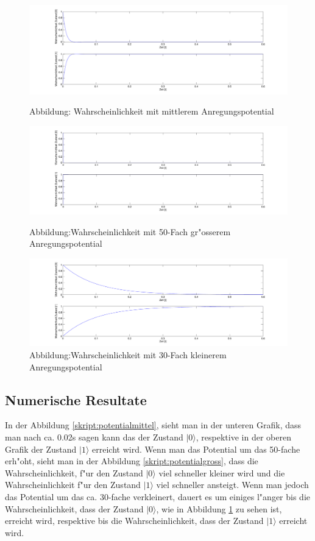 \begin{refsection}
\begin{figure}
\centering
\includegraphics[width=1\textwidth]{flash/graphics/potentialmittel.pdf}
\caption{Abbildung: Wahrscheinlichkeit mit mittlerem Anregungspotential
\label{skript:potentialmittel}}
%
\centering
\includegraphics[width=1\textwidth]{flash/graphics/potentialgross.pdf}
\caption{Abbildung:Wahrscheinlichkeit mit 50-Fach gr"osserem Anregungspotential
\label{skript:potentialgross}}
%
\centering
\includegraphics[width=1\textwidth]{flash/graphics/potentialklein.pdf}
\caption{Abbildung:Wahrscheinlichkeit mit 30-Fach kleinerem Anregungspotential
\label{skript:potentialklein}}
\end{figure}

\subsection{Numerische Resultate}
In der Abbildung \ref{skript:potentialmittel}, sieht man in der unteren
Grafik, dass man nach ca. 0.02s sagen kann das der Zustand $|0\rangle$, 
respektive in der oberen Grafik der Zustand $|1\rangle$ erreicht wird.
Wenn man das Potential um das 50-fache erh"oht, sieht man in der Abbildung
\ref{skript:potentialgross}, dass die Wahrscheinlichkeit, f"ur  den Zustand
$|0\rangle$ viel schneller kleiner wird und die Wahrscheinlichkeit f"ur den
Zustand $|1\rangle$ viel schneller ansteigt.
Wenn man jedoch das Potential um das ca. 30-fache verkleinert, dauert es
um einiges l"anger bis die Wahrscheinlichkeit, dass der Zustand $|0\rangle$,
wie in Abbildung \ref{skript:potentialklein} zu sehen ist, erreicht wird,
respektive bis die Wahrscheinlichkeit, dass der Zustand $|1\rangle$ erreicht
wird.


\end{refsection}

